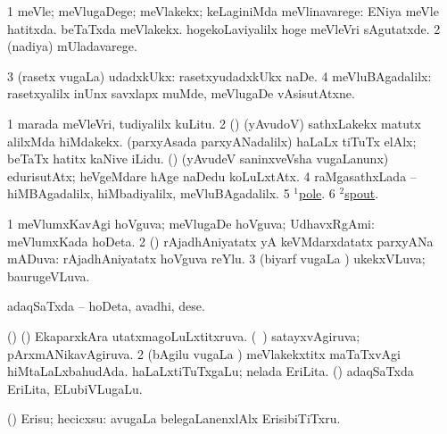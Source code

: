 \bentry 
{} 
\gl{\upa}
\bmng
\bnum
\num{1} meVle; meVlugaDege; meVlakekx; keLaginiMda meVlinavarege:  ENiya meVle hatitxda.  beTaTxda meVlakekx.  hogekoLaviyalilx hoge meVleVri sAgutatxde. 
\num{2} (nadiya) mUladavarege. 
\num{3} (rasetx \mo vugaLa) udadxkUkx:  rasetxyudadxkUkx naDe. 
\num{4} meVluBAgadalilx:  rasetxyalilx inUnx savxlapx muMde, meVlugaDe vAsisutAtxne. 
\enum
\emng

\noindent
\gl{\pagu}
\expl{}
\bmng
\bnum
\num{1}  marada meVleVri, tudiyalilx kuLitu. 
\num{2}  (\rUpa) (yAvudoV) sathxLakekx matutx alilxMda hiMdakekx. 
  
\banum
{} (parxyAsada parxyANadalilx) haLaLx tiTuTx elAlx; beTaTx hatitx kaNive iLidu. 
 (\rUpa) (yAvudeV saninxveVsha \mo vugaLanunx) edurisutAtx; heVgeMdare hAge naDedu koLuLxtAtx. 
\eanum
\numie
\num{4}  raMgasathxLada -- hiMBAgadalilx, hiMbadiyalilx, meVluBAgadalilx. 
\num{5}  \hyperref{kandict_p.pdf}{P}{pole(1) pagu(2)}{$^1$pole}. 
\num{6}  \hyperref{kandict_s.pdf}{S}{spout(2) pagu}{$^2$spout}. 
\enum
\emng
\eentry

\bentry
{} 
\gl{\gu}
\expl{}
\bmng
\bnum
\num{1} meVlumxKavAgi hoVguva; meVlugaDe hoVguva; UdhavxRgAmi:  meVlumxKada hoDeta. 
\num{2} (\birx) rAjadhAniyatatx yA keVMdarxdatatx parxyANa mADuva:  rAjadhAniyatatx hoVguva reYlu. 
\num{3} (biyarf \mo vugaLa \vi) ukekxVLuva; baurugeVLuva. 
\enum
\emng
\eentry

\bentry
{} 
\gl{\nA}
\expl{}
\bmng
adaqSaTxda -- hoDeta, avadhi, dese. 
\emng

\noindent
\gl{\pagu}
\expl{}
\bmng
\bnum
{}  (\AmA) 
\banum
{} (\birx) EkaparxkAra utatxmagoLuLxtitxruva. 
 (\kanmu\ \ame) satayxvAgiruva; pArxmANikavAgiruva. 
\eanum
\numie
\num{2}  (bAgilu \mo vugaLa \vi) meVlakekxtitx maTaTxvAgi hiMtaLaLxbahudAda. 
  
\banum
{} haLaLxtiTuTxgaLu; nelada EriLita. 
 (\rUpa) adaqSaTxda EriLita, ELubiVLugaLu. 
\eanum
\numie
\enum
\emng
\eentry

\bentry
{} 
\gl{\kirx}


\noindent
\gl{\sakirx}
\expl{}
\bmng
(\AmA) Erisu; hecicxsu:  avugaLa belegaLanenxlAlx ErisibiTiTxru. 
\emng

